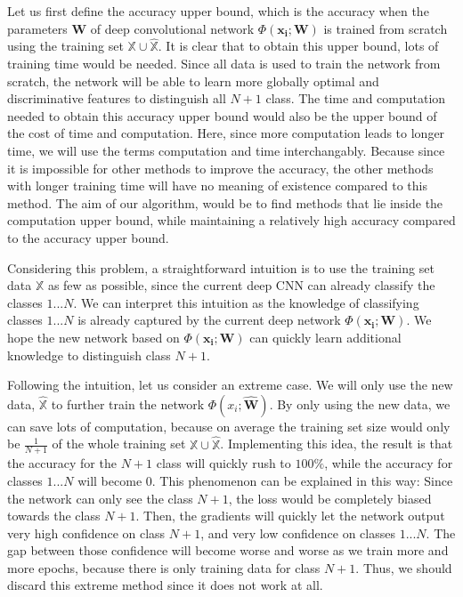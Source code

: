 Let us first define the accuracy upper bound, which is the accuracy when the parameters $\mathbf{W}$ of deep convolutional network $\Phi(\mathbf{x_i}; \mathbf{W})$ is trained from scratch using the training set $\mathbb{X}\cup \hat{\mathbb{X}}$. It is clear that to obtain this upper bound, lots of training time would be needed. Since all data is used to train the network from scratch, the network will be able to learn more globally optimal and discriminative features to distinguish all $N+1$ class. The time and computation needed to obtain this accuracy upper bound would also be the upper bound of the cost of time and computation. Here, since more computation leads to longer time, we will use the terms computation and time interchangably. Because since it is impossible for other methods to improve the accuracy, the other methods with longer training time will have no meaning of existence compared to this method. The aim of our algorithm, would be to find methods that lie inside the computation upper bound, while maintaining a relatively high accuracy compared to the accuracy upper bound.

Considering this problem, a straightforward intuition is to use the training set data $\mathbb{X}$ as few as possible, since the current deep CNN can already classify the classes $1...N$. We can interpret this intuition as the knowledge of classifying classes $1...N$ is already captured by the current deep network $\Phi(\mathbf{x_i}; \mathbf{W})$. We hope the new network based on $\Phi(\mathbf{x_i}; \mathbf{W})$ can quickly learn additional knowledge to distinguish class $N+1$. 

Following the intuition, let us consider an extreme case. We will only use the new data, $\hat{\mathbb{X}}$ to further train the network $\Phi(x_i; \hat{\mathbf{W}})$. By only using the new data, we can save lots of computation, because on average the training set size would only be $\frac{1}{N+1}$ of the whole training set $\mathbb{X}\cup \hat{\mathbb{X}}$. Implementing this idea, the result is that the accuracy for the $N+1$ class will quickly rush to $100\%$, while the accuracy for classes $1...N$ will become $0$. This phenomenon can be explained in this way: Since the network can only see the class $N+1$, the loss would be completely biased towards the class $N+1$. Then, the gradients will quickly let the network output very high confidence on class $N+1$, and very low confidence on classes $1...N$. The gap between those confidence will become worse and worse as we train more and more epochs, because there is only training data for class $N+1$. Thus, we should discard this extreme method since it does not work at all.

